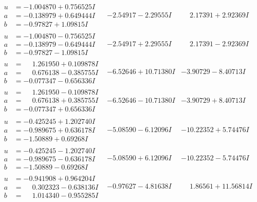 \documentclass[1p]{elsarticle_modified}
\theoremstyle{definition}
\begin{document}
$$\begin{array}{c|c|c}
\begin{aligned}
u &= -1.004870 + 0.756525 I \\
a &= -0.138979 + 0.649444 I \\
b &= -0.97827 + 1.09815 I\end{aligned}
 & -2.54917 - 2.29555 I & \phantom{-}2.17391 + 2.92369 I \\ \hline\begin{aligned}
u &= -1.004870 - 0.756525 I \\
a &= -0.138979 - 0.649444 I \\
b &= -0.97827 - 1.09815 I\end{aligned}
 & -2.54917 + 2.29555 I & \phantom{-}2.17391 - 2.92369 I \\ \hline\begin{aligned}
u &= \phantom{-}1.261950 + 0.109878 I \\
a &= \phantom{-}0.676138 - 0.385755 I \\
b &= -0.077347 - 0.656336 I\end{aligned}
 & -6.52646 + 10.71380 I & -3.90729 - 8.40713 I \\ \hline\begin{aligned}
u &= \phantom{-}1.261950 - 0.109878 I \\
a &= \phantom{-}0.676138 + 0.385755 I \\
b &= -0.077347 + 0.656336 I\end{aligned}
 & -6.52646 - 10.71380 I & -3.90729 + 8.40713 I \\ \hline\begin{aligned}
u &= -0.425245 + 1.202740 I \\
a &= -0.989675 + 0.636178 I \\
b &= -1.50889 + 0.69268 I\end{aligned}
 & -5.08590 - 6.12096 I & -10.22352 + 5.74476 I \\ \hline\begin{aligned}
u &= -0.425245 - 1.202740 I \\
a &= -0.989675 - 0.636178 I \\
b &= -1.50889 - 0.69268 I\end{aligned}
 & -5.08590 + 6.12096 I & -10.22352 - 5.74476 I \\ \hline\begin{aligned}
u &= -0.941908 + 0.964204 I \\
a &= \phantom{-}0.302323 - 0.638136 I \\
b &= \phantom{-}1.014340 - 0.955285 I\end{aligned}
 & -0.97627 - 4.81638 I & \phantom{-}1.86561 + 11.56814 I \\ \hline\begin{aligned}

\end{aligned}
\end{array}$$
\end{document}
